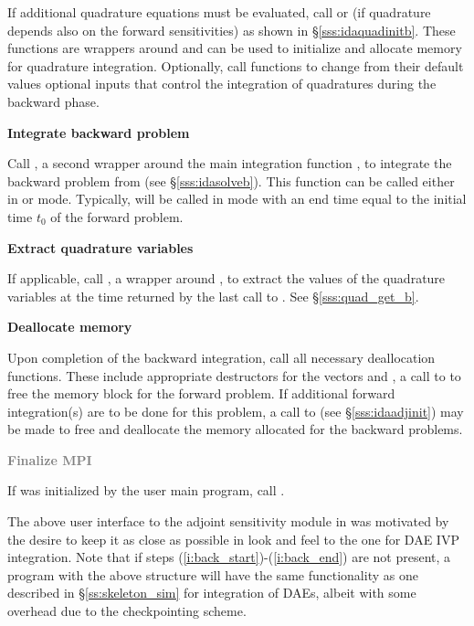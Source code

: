 \begin{Steps}
  If additional quadrature equations must be evaluated, 
  call  or  (if quadrature depends also on the
  forward sensitivities) as shown in \S\ref{sss:idaquadinitb}. These functions are
  wrappers around  and can be used to initialize and allocate 
  memory for quadrature integration. Optionally, call  functions 
  to change from their default values optional inputs that control the integration 
  of quadratures during the backward phase.

\item
  {\bf Integrate backward problem}

  Call , a second wrapper around the {\idas} main integration
  function , to integrate the backward problem from 
  (see \S\ref{sss:idasolveb}). This function can be called either in 
  or  mode. Typically,  will be called in 
  mode with an end time equal to the initial time $t_0$ of the forward problem.

\item \label{i:back_end}
  {\bf Extract quadrature variables}

  If applicable, call , a wrapper around ,
  to extract the values of the quadrature variables at the time returned
  by the last call to .  See \S\ref{sss:quad_get_b}.

\item
  {\bf Deallocate memory}

  Upon completion of the backward integration, call all necessary deallocation
  functions. These include appropriate destructors for the vectors  and
  , a call to  to free the {\idas} memory block for the
  forward problem.  If additional forward integration(s) are to be done for
  this problem, a call to  (see \S\ref{sss:idaadjinit}) may be
  made to free and deallocate the memory allocated for the backward problems.

\item
  \textcolor{gray}{\bf Finalize MPI}

  {\p} If {\mpi} was initialized by the user main program, call .

\end{Steps}

The above user interface to the adjoint sensitivity module in {\idas} was motivated by
the desire to keep it as close as possible in look and feel to the one for DAE IVP 
integration. Note that if steps (\ref{i:back_start})-(\ref{i:back_end}) are not present, 
a program with the above structure will have the same functionality as one described in
\S\ref{ss:skeleton_sim} for integration of DAEs, albeit with some overhead due to 
the checkpointing scheme.

